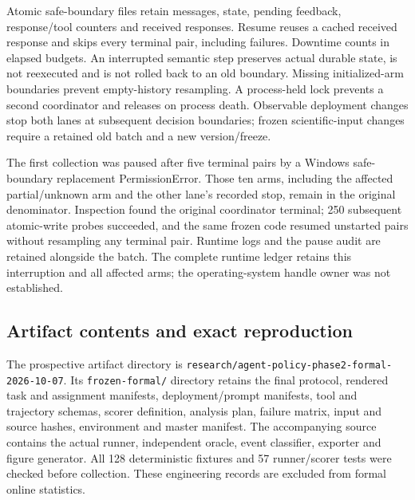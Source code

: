 \documentclass[11pt,a4paper]{article}
\newcommand{\code}[1]{\nolinkurl{#1}}
\begin{document}
Atomic safe-boundary files retain messages, state, pending feedback, response/tool counters and received responses. Resume reuses a cached received response and skips every terminal pair, including failures. Downtime counts in elapsed budgets. An interrupted semantic step preserves actual durable state, is not reexecuted and is not rolled back to an old boundary. Missing initialized-arm boundaries prevent empty-history resampling. A process-held lock prevents a second coordinator and releases on process death. Observable deployment changes stop both lanes at subsequent decision boundaries; frozen scientific-input changes require a retained old batch and a new version/freeze.

The first collection was paused after five terminal pairs by a Windows safe-boundary replacement PermissionError. Those ten arms, including the affected partial/unknown arm and the other lane's recorded stop, remain in the original denominator. Inspection found the original coordinator terminal; 250 subsequent atomic-write probes succeeded, and the same frozen code resumed unstarted pairs without resampling any terminal pair. Runtime logs and the pause audit are retained alongside the batch. The complete runtime ledger retains this interruption and all affected arms; the operating-system handle owner was not established.

\subsection{Artifact contents and exact reproduction}
The prospective artifact directory is \code{research/agent-policy-phase2-formal-2026-10-07}. Its \code{frozen-formal/} directory retains the final protocol, rendered task and assignment manifests, deployment/prompt manifests, tool and trajectory schemas, scorer definition, analysis plan, failure matrix, input and source hashes, environment and master manifest. The accompanying source contains the actual runner, independent oracle, event classifier, exporter and figure generator. All 128 deterministic fixtures and 57 runner/scorer tests were checked before collection. These engineering records are excluded from formal online statistics.
\end{document}
